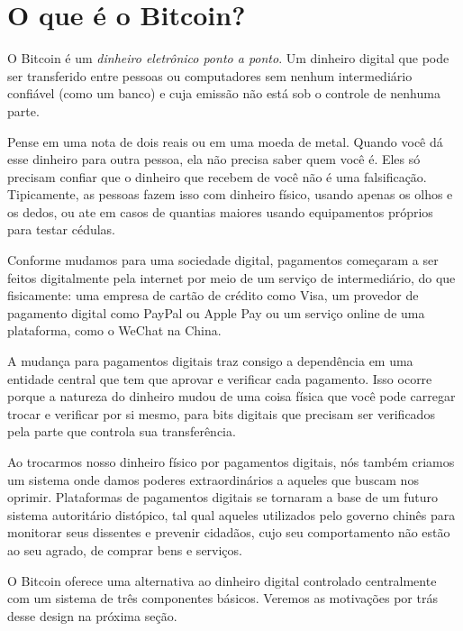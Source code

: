 \chapter{O que é o Bitcoin?}
\label{ch:capitulo1}

O Bitcoin é um \textit{dinheiro eletrônico ponto a ponto}. Um dinheiro digital que pode ser transferido entre pessoas ou computadores sem nenhum intermediário confiável (como um banco) e cuja emissão não está sob o controle de nenhuma parte.

Pense em uma nota de dois reais ou em uma moeda de metal. Quando você dá esse dinheiro para outra pessoa, ela não precisa saber quem você é. Eles só precisam confiar que o dinheiro que recebem de você não é uma falsificação. Tipicamente, as pessoas fazem isso com dinheiro físico, usando apenas os olhos e os dedos, ou ate em casos de quantias maiores usando equipamentos próprios para testar cédulas.

Conforme mudamos para uma sociedade digital, pagamentos começaram a ser feitos digitalmente pela internet por meio de um serviço de intermediário, do que fisicamente: uma empresa de cartão de crédito como Visa, um provedor de pagamento digital como PayPal ou Apple Pay ou um serviço online de uma plataforma, como o WeChat na China.

A mudança para pagamentos digitais traz consigo a dependência em uma entidade central que tem que aprovar e verificar cada pagamento. Isso ocorre porque a natureza do dinheiro mudou de uma coisa física que você pode carregar trocar e verificar por si mesmo, para bits digitais que precisam ser verificados pela parte que controla sua transferência.


Ao trocarmos nosso dinheiro físico por pagamentos digitais, nós também criamos um sistema onde damos poderes extraordinários a aqueles que buscam nos oprimir.
Plataformas de pagamentos digitais se tornaram a base de um futuro sistema autoritário distópico, tal qual aqueles utilizados pelo governo chinês para monitorar seus dissentes e prevenir cidadãos, cujo seu comportamento não estão ao seu agrado, de comprar bens e serviços.

O Bitcoin oferece uma alternativa ao dinheiro digital controlado centralmente com um sistema de três componentes básicos. Veremos as motivações por trás desse design na próxima seção.

